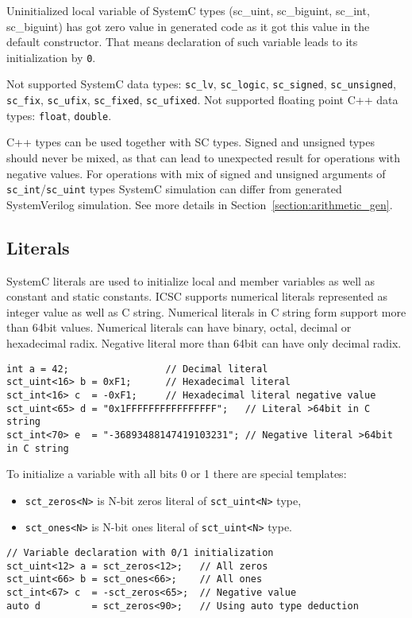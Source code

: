 Uninitialized local variable of SystemC types (sc\_uint, sc\_biguint, sc\_int, sc\_biguint) has got zero value in generated code as it got this value in the default constructor.
That means declaration of such variable leads to its initialization by {\tt 0}.

Not supported SystemC data types: {\tt sc\_lv}, {\tt sc\_logic}, {\tt sc\_signed}, {\tt sc\_unsigned}, {\tt sc\_fix}, {\tt sc\_ufix}, {\tt sc\_fixed}, {\tt sc\_ufixed}. 
Not supported floating point C++ data types: {\tt float}, {\tt double}.

C++ types can be used together with SC types. Signed and unsigned types should never be mixed, as that can lead to unexpected result for operations with negative values. For operations with mix of signed and unsigned arguments of {\tt sc\_int}/{\tt sc\_uint} types SystemC simulation can differ from generated SystemVerilog simulation. See more details in Section~\ref{section:arithmetic_gen}.

\subsection{Literals}

SystemC literals are used to initialize local and member variables as well as constant and static constants. 
ICSC supports numerical literals represented as integer value as well as C string. Numerical literals in C string form support more than 64bit values. Numerical literals can have binary, octal, decimal or hexadecimal radix. Negative literal more than 64bit can have only decimal radix. 
%
\begin{lstlisting}[style=mycpp]
int a = 42;                 // Decimal literal
sct_uint<16> b = 0xF1;      // Hexadecimal literal
sct_int<16> c  = -0xF1;     // Hexadecimal literal negative value
sct_uint<65> d = "0x1FFFFFFFFFFFFFFFF";   // Literal >64bit in C string   
sct_int<70> e  = "-36893488147419103231"; // Negative literal >64bit in C string 
\end{lstlisting}

To initialize a variable with all bits 0 or 1 there are special templates:
\begin{itemize}
\item {\tt sct\_zeros<N>} is N-bit zeros literal of {\tt sct\_uint<N>} type,
\item {\tt sct\_ones<N>} is N-bit ones literal of {\tt sct\_uint<N>} type.
\end{itemize}

\begin{lstlisting}[style=mycpp]
// Variable declaration with 0/1 initialization
sct_uint<12> a = sct_zeros<12>;   // All zeros
sct_uint<66> b = sct_ones<66>;    // All ones
sct_int<67> c  = -sct_zeros<65>;  // Negative value
auto d         = sct_zeros<90>;   // Using auto type deduction
\end{lstlisting}

